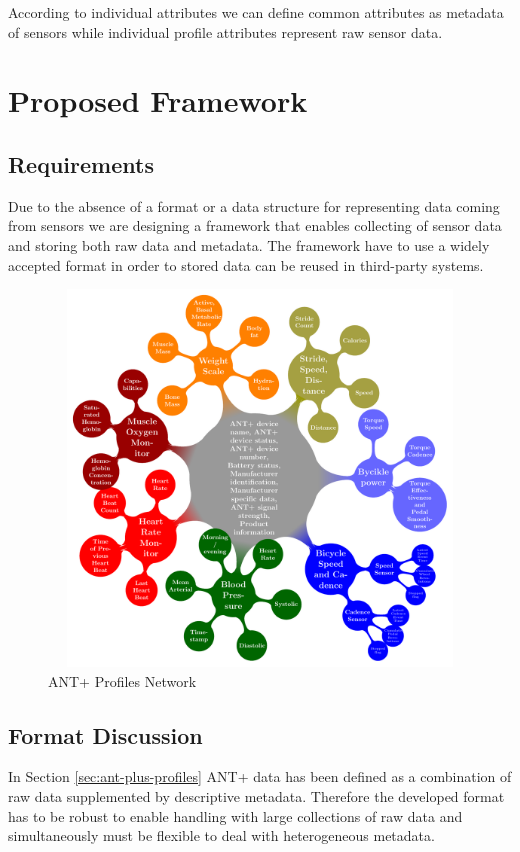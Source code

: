 \documentclass[conference]{IEEEconf}
\begin{document}
According to individual attributes we can define common attributes as metadata of sensors while individual profile attributes represent raw sensor data. 

\section{Proposed Framework}\label{sec:framework}

\subsection{Requirements}\label{sec:requirements}

Due to the absence of a format or a data structure for representing data coming from sensors we are designing a framework that enables collecting of sensor data and storing both raw data and metadata. The framework have to use a widely accepted format in order to stored data can be reused in third-party systems.

\begin{figure}
\centering\includegraphics[width=12cm, height=10cm]{AntPlusProfiles}
\caption{\label{AntPlus}ANT+ Profiles Network}
\end{figure}

\subsection{Format Discussion}

In Section \ref{sec:ant-plus-profiles} ANT+ data has been defined as a combination of raw data supplemented by descriptive metadata. Therefore the developed format has to be robust to enable handling with large collections of raw data and simultaneously must be flexible to deal with heterogeneous metadata.
\end{document}
